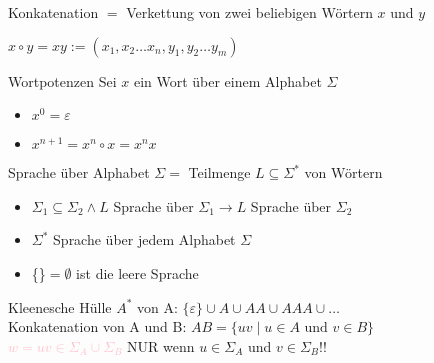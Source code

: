\begin{definition}{Konkatenation}
    $=$ Verkettung von zwei beliebigen Wörtern $x$ und $y$

    $
    x \circ y=x y:=\left(x_{1}, x_{2} \ldots x_{n}, y_{1}, y_{2} \ldots y_{m}\right)
    $
\end{definition}

\begin{definition}{Wortpotenzen} Sei $x$ ein Wort über einem Alphabet $\Sigma$\\
    \begin{minipage}{0.2\linewidth}
        \begin{itemize}
            \item $x^{0}=\varepsilon$
        \end{itemize}
    \end{minipage}
    \begin{minipage}{0.5\linewidth}
        \begin{itemize}
            \item $x^{n+1}=x^{n} \circ x=x^{n} x$
        \end{itemize}
    \end{minipage}
\end{definition}

\begin{definition}{Sprache}
    über Alphabet $\Sigma=$ Teilmenge $L \subseteq \Sigma^{*}$ von Wörtern
    \begin{itemize}
    \item $\Sigma_{1} \subseteq \Sigma_{2} \wedge L$ Sprache über $\Sigma_{1} \rightarrow L$ Sprache über $\Sigma_{2}$
    \item $\Sigma^{*}$ Sprache über jedem Alphabet $\Sigma$
    \item \{\}$=\emptyset$ ist die leere Sprache
    \end{itemize}

    Kleenesche Hülle $A^{*}$ von A: $\{\varepsilon\} \cup A \cup A A \cup A A A \cup \ldots$\\
    Konkatenation von A und B: $A B=\{u v \mid u \in A \text { und } v \in B\}$\\
    \textcolor{pink}{$w = uv \in \Sigma_A \cup \Sigma_B$} NUR wenn $u \in \Sigma_A$ und $v \in \Sigma_B$!!
\end{definition}
